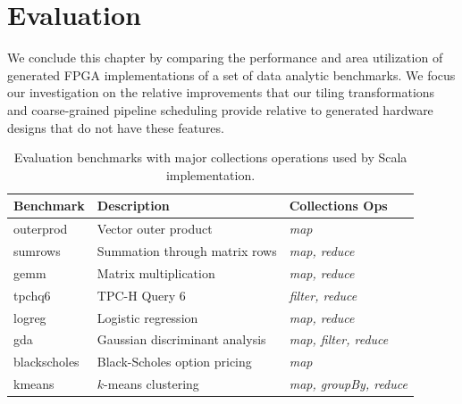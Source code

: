\section{Evaluation}
\label{delite-evaluation}


We conclude this chapter by comparing the performance and
area utilization of generated FPGA implementations of a set of data analytic benchmarks.
We focus our investigation on the relative improvements that our tiling transformations and
coarse-grained pipeline scheduling provide relative to
generated hardware designs that do not have these features.

\begin{table}
\centering\footnotesize
\hspace{-0.022\textwidth}\begin{tabular}{lll}
\toprule

{\bf Benchmark} & {\bf Description} & {\bf Collections Ops}\\ \midrule
outerprod & Vector outer product & \emph{map}\\ \midrule
sumrows & Summation through matrix rows & \emph{map, reduce}\\ \midrule
gemm & Matrix multiplication & \emph{map, reduce}\\ \midrule
tpchq6 & TPC-H Query 6 & \emph{filter, reduce}\\ \midrule
logreg & Logistic regression & \emph{map, reduce}\\ \midrule
gda & Gaussian discriminant analysis & \emph{map, filter, reduce}\\ \midrule
blackscholes & Black-Scholes option pricing & \emph{map}\\ \midrule
kmeans & $k$-means clustering & \emph{map, groupBy, reduce}\\ \bottomrule
\end{tabular}

\caption{Evaluation benchmarks with major collections operations used by
Scala implementation.}
\label{table:benchmarks}
\end{table}

